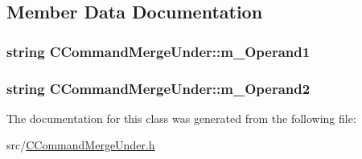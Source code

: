 \subsection{Member Data Documentation}
\subsubsection[{\texorpdfstring{m\+\_\+\+Operand1}{m_Operand1}}]{\setlength{\rightskip}{0pt plus 5cm}string C\+Command\+Merge\+Under\+::m\+\_\+\+Operand1\hspace{0.3cm}{\ttfamily [private]}}\hypertarget{classCCommandMergeUnder_abeada56729aa197e14779621c7eb03c0}{}\label{classCCommandMergeUnder_abeada56729aa197e14779621c7eb03c0}
\subsubsection[{\texorpdfstring{m\+\_\+\+Operand2}{m_Operand2}}]{\setlength{\rightskip}{0pt plus 5cm}string C\+Command\+Merge\+Under\+::m\+\_\+\+Operand2\hspace{0.3cm}{\ttfamily [private]}}\hypertarget{classCCommandMergeUnder_adfb43ee9af1ba4ba89e49b63a08b0cba}{}\label{classCCommandMergeUnder_adfb43ee9af1ba4ba89e49b63a08b0cba}


The documentation for this class was generated from the following file\+:\begin{DoxyCompactItemize}
\item 
src/\hyperlink{CCommandMergeUnder_8h}{C\+Command\+Merge\+Under.\+h}\end{DoxyCompactItemize}
